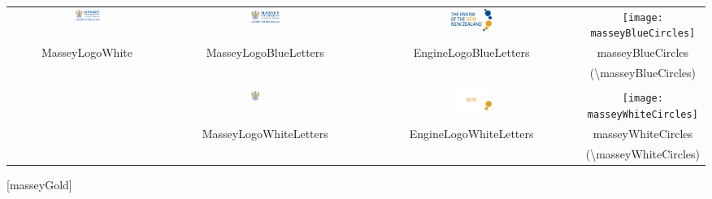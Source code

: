 \documentclass[10pt,aspectratio=43]{beamer}
\begin{document}
\begin{frame}
\color{masseyGold}
\vspace*{-5ex}
\footnotesize
\begin{center}
\begin{tabular}{cccc}
\includegraphics[width=0.2\textwidth]{uniLogo/MasseyLogoWhite}&
\includegraphics[width=0.2\textwidth]{uniLogo/MasseyLogoBlueLetters}&
\includegraphics[width=0.2\textwidth]{uniLogo/EngineLogoBlueLetters}&
\texttt{[image: \\masseyBlueCircles]}\\
MasseyLogoWhite & MasseyLogoBlueLetters& EngineLogoBlueLetters &
masseyBlueCircles \\
&&&(\textbackslash masseyBlueCircles)\\&&&\\
&
\includegraphics[width=0.2\textwidth]{uniLogo/MasseyLogoWhiteLetters}&
\includegraphics[width=0.2\textwidth]{uniLogo/EngineLogoWhiteLetters}&
\texttt{[image: \\masseyWhiteCircles]}\\
& MasseyLogoWhiteLetters& EngineLogoWhiteLetters &
masseyWhiteCircles \\&&&(\textbackslash masseyWhiteCircles)\\
\end{tabular}
\end{center}
\end{frame}


[masseyGold]
\end{document}
